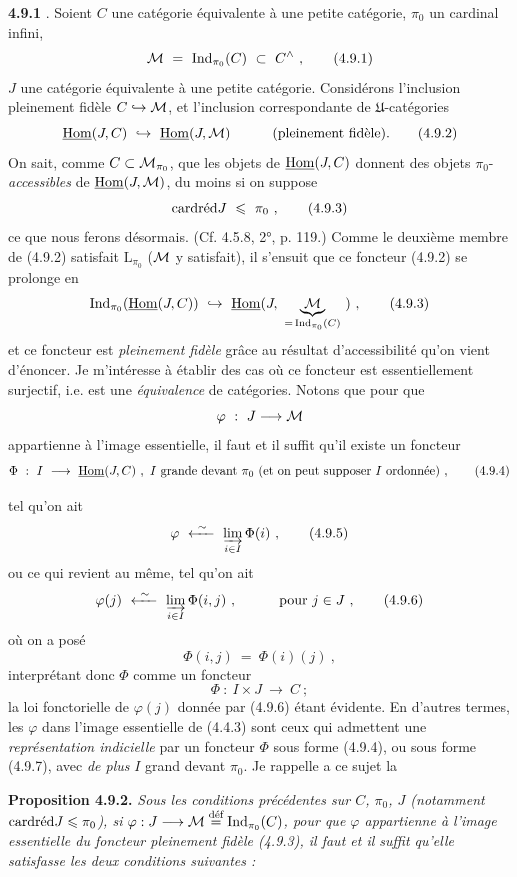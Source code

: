 \textbf{4.9.1} . Soient $C$ une catégorie équivalente à une petite catégorie, $\pi_0$ un cardinal infini,
\[
\cM \ = \ \Ind_{\pi_0}(C) \ \subset\ C^{\wedge}\ , \tag*{(4.9.1)}
\]
$J$ une catégorie équivalente à une petite catégorie. Considérons l'inclusion pleinement fidèle $C \hookrightarrow \cM$, et l'inclusion correspondante de $\mathfrak{U}$-catégories
\[
\uHom(J, C) \ \hookrightarrow\ \uHom(J, \cM) \qquad\quad \text{(pleinement fidèle).} \tag*{(4.9.2)}
\]
On sait, comme $C \subset \cM_{\pi_0}$, que les objets de $\uHom(J, C)$ donnent des objets $\pi_0$-\textit{accessibles} de $\uHom(J, \cM)$, du moins si on suppose
\[
\card\red J \ \leqslant\ \pi_0\ , \tag*{(4.9.3)}
\]
ce que nous ferons désormais. (Cf. 4.5.8, 2°, p. 119.) Comme le deuxième membre de (4.9.2) satisfait $\mathrm{L}_{\pi_0}$ ($\cM$ y satisfait), il s'ensuit que ce foncteur (4.9.2) se prolonge en
\[
\Ind_{\pi_0}(\uHom(J, C)) \ \hookrightarrow\ \uHom(J,\ \underbrace{\cM}_{=\,\Ind_{\pi_0}(C)}\ )\ , \tag*{(4.9.3)}
\]
et ce foncteur est \textit{pleinement fidèle} grâce au résultat d'accessibilité qu'on vient d'énoncer. Je m'intéresse à établir des cas où ce foncteur est essentiellement surjectif, i.e. est une \textit{équivalence} de catégories. Notons que pour que
\[
\varphi \ :\ J \longrightarrow \cM
\]
appartienne à l'image essentielle, il faut et il suffit qu'il existe un foncteur
\[
\Phi \ :\ I \ \longrightarrow\ \uHom(J, C)\ ,\ I \text{ grande devant } \pi_0 \text{ (et on peut supposer } I \text{ ordonnée)}\ , \tag*{(4.9.4)}
\]


tel qu'on ait
\[
\varphi \ \xleftarrow{\ \sim\ }\ \varinjlim_{i\in I} \Phi(i)\ , \tag*{(4.9.5)}
\]
ou ce qui revient au même, tel qu'on ait
\[
\varphi(j) \ \xleftarrow{\ \sim\ }\ \varinjlim_{i\in I} \Phi(i, j)\ , \qquad\quad \text{pour } j \in J\ , \tag*{(4.9.6)}
\]
où on a posé
\[
\Phi(i, j) \ = \ \Phi(i)(j)\ ,
\]
interprétant donc $\Phi$ comme un foncteur
\[
\Phi \ :\ I \times J \ \longrightarrow\ C\ ; \tag*{(4.9.7)}
\]
la loi fonctorielle de $\varphi(j)$ donnée par (4.9.6) étant évidente. En d'autres termes, les $\varphi$ dans l'image essentielle de (4.4.3) sont ceux qui admettent une \textit{représentation indicielle} par un foncteur $\Phi$ sous forme (4.9.4), ou sous forme (4.9.7), avec \textit{de plus} $I$ grand devant $\pi_0$. Je rappelle a ce sujet la %

\textbf{Proposition 4.9.2.} \textit{Sous les conditions précédentes sur $C$, $\pi_0$, $J$ (notamment} $\card\red J \leqslant \pi_0$\textit{), si $\varphi : J \longrightarrow \cM \defeq \Ind_{\pi_0}(C)$, pour que $\varphi$ appartienne à l'image essentielle du foncteur pleinement fidèle (4.9.3), il faut et il suffit qu'elle satisfasse les deux conditions suivantes :}

